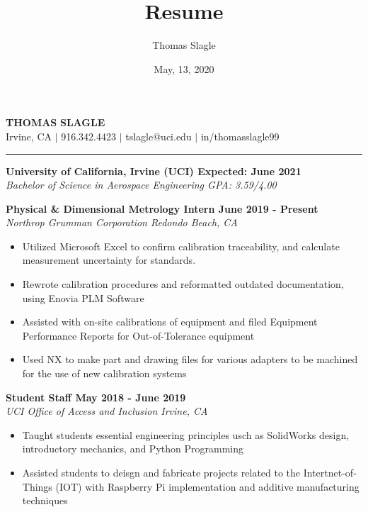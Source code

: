 \documentclass[10pt]{article}
\newcommand{\doublerule}[1][.4pt]{%
  \noindent
  \makebox[0pt][l]{\rule[.7ex]{\linewidth}{#1}}%
  \rule[.3ex]{\linewidth}{#1}}
\begin{document}
\title{Resume}
\author{Thomas Slagle}
\date{May, 13, 2020}

\thispagestyle{empty}
\pagestyle{empty}


\begin{center}
    {\LARGE\textbf{T}\Large\textbf{HOMAS} \LARGE\textbf{S}\Large\textbf{LAGLE}} \\
    Irvine, CA $\mid$ 916.342.4423 $\mid$ tslagle@uci.edu $\mid$ in/thomasslagle99
    \doublerule[1pt]
\end{center}

\myrule

\noindent\textbf{University of California, Irvine (UCI) \hfill Expected: June 2021}\\
\textit{Bachelor of Science in Aerospace Engineering \hfill GPA: 3.59/4.00}

\vspace{0.15in}

\myrule
\noindent\textbf{Physical \& Dimensional Metrology Intern \hfill June 2019 - Present}\\
\textit{Northrop Grumman Corporation \hfill Redondo Beach, CA}
\begin{itemize}
    \item Utilized Microsoft Excel to confirm calibration traceability, and calculate measurement uncertainty for standards.
    \item Rewrote calibration procedures and reformatted outdated documentation, using Enovia PLM Software
    \item Assisted with on-site calibrations of equipment and filed Equipment Performance Reports for Out-of-Tolerance equipment
    \item Used NX to make part and drawing files for various adapters to be machined for the use of new calibration systems
\end{itemize}

\vspace{0.08in}

\noindent\textbf{Student Staff \hfill May 2018 - June 2019}\\
\textit{UCI Office of Access and Inclusion  \hfill Irvine, CA}
\begin{itemize}
    \item Taught students essential engineering principles usch as SolidWorks design, introductory mechanics, and Python Programming
    \item Assisted students to deisgn and fabricate projects related to the Intertnet-of-Things (IOT) with Raspberry Pi implementation and additive manufacturing techniques
\end{itemize}
\end{document}
